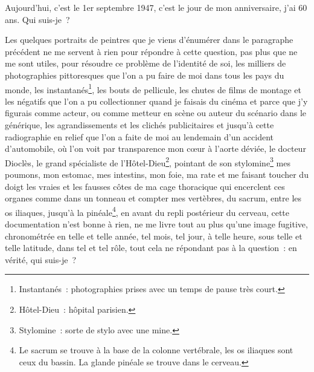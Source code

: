 {

Aujourd'hui, c'est le 1er septembre 1947, c'est le jour de mon
anniversaire, j'ai 60 ans. Qui suis-je~?

Les quelques portraits de peintres que je viens d'énumérer dans le
paragraphe précédent ne me servent à rien pour répondre à cette
question, pas plus que ne me sont utiles, pour résoudre ce problème
de l'identité de soi, les milliers de photographies pittoresques que
l'on a pu faire de moi dans tous les pays du monde, les
instantanés\footnote{Instantanés~: photographies prises avec un temps
de pause très court.}, les bouts de pellicule, les chutes de films de
montage et les négatifs que l'on a pu collectionner quand je faisais
du cinéma et parce que j'y figurais comme acteur, ou comme metteur en
scène ou auteur du scénario dans le générique, les agrandissements et
les clichés publicitaires et jusqu'à cette radiographie en relief que
l'on a faite de moi au lendemain d'un accident d'automobile, où l'on
voit par transparence mon cœur à l'aorte déviée, le docteur Dioclès,
le grand spécialiste de l'Hôtel-Dieu\footnote{Hôtel-Dieu~: hôpital
parisien.}, pointant de son stylomine\footnote{Stylomine~: sorte de
stylo avec une mine.} mes poumons, mon estomac, mes intestins, mon
foie, ma rate et me faisant toucher du doigt les vraies et les
fausses côtes de ma cage thoracique qui encerclent ces organes comme
dans un tonneau et compter mes vertèbres, du sacrum, entre les os
iliaques, jusqu'à la pinéale\footnote{Le sacrum se trouve à la base
de la colonne vertébrale, les os iliaques sont ceux du bassin. La
glande pinéale se trouve dans le cerveau.}, en avant du repli
postérieur du cerveau, cette documentation n'est bonne à rien, ne me
livre tout au plus qu'une image fugitive, chronométrée en telle et
telle année, tel mois, tel jour, à telle heure, sous telle et telle
latitude, dans tel et tel rôle, tout cela ne répondant pas à la
question~: en vérité, qui suis-je~?

}
